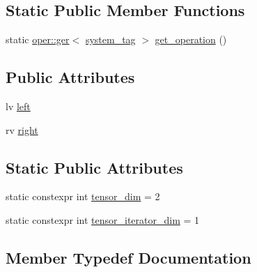 \subsection*{Static Public Member Functions}
\begin{DoxyCompactItemize}
\item 
static \hyperlink{structbc_1_1oper_1_1ger}{oper\+::ger}$<$ \hyperlink{structbc_1_1tensors_1_1exprs_1_1Bin__Op_3_01oper_1_1ger_3_01SystemTag_01_4_00_01lv_00_01rv_01_4_abcd305e8f31931d98bc3cbd42833b73d}{system\+\_\+tag} $>$ \hyperlink{structbc_1_1tensors_1_1exprs_1_1Bin__Op_3_01oper_1_1ger_3_01SystemTag_01_4_00_01lv_00_01rv_01_4_a662c70bc8aec8c6ccfde818e119970f9}{get\+\_\+operation} ()
\end{DoxyCompactItemize}
\subsection*{Public Attributes}
\begin{DoxyCompactItemize}
\item 
lv \hyperlink{structbc_1_1tensors_1_1exprs_1_1Bin__Op_3_01oper_1_1ger_3_01SystemTag_01_4_00_01lv_00_01rv_01_4_a2d533a67c204fc5ae4fbc1e0ee20007a}{left}
\item 
rv \hyperlink{structbc_1_1tensors_1_1exprs_1_1Bin__Op_3_01oper_1_1ger_3_01SystemTag_01_4_00_01lv_00_01rv_01_4_ade316a4230d01aef20028ae075532341}{right}
\end{DoxyCompactItemize}
\subsection*{Static Public Attributes}
\begin{DoxyCompactItemize}
\item 
static constexpr int \hyperlink{structbc_1_1tensors_1_1exprs_1_1Bin__Op_3_01oper_1_1ger_3_01SystemTag_01_4_00_01lv_00_01rv_01_4_ab6f71ecc8a5b1136018082fb87fefa3c}{tensor\+\_\+dim} = 2
\item 
static constexpr int \hyperlink{structbc_1_1tensors_1_1exprs_1_1Bin__Op_3_01oper_1_1ger_3_01SystemTag_01_4_00_01lv_00_01rv_01_4_adc98e4bb70c5743aadbbd5e83b332875}{tensor\+\_\+iterator\+\_\+dim} = 1
\end{DoxyCompactItemize}


\subsection{Member Typedef Documentation}
\mbox{\label{structbc_1_1tensors_1_1exprs_1_1Bin__Op_3_01oper_1_1ger_3_01SystemTag_01_4_00_01lv_00_01rv_01_4_abcd305e8f31931d98bc3cbd42833b73d}} 
